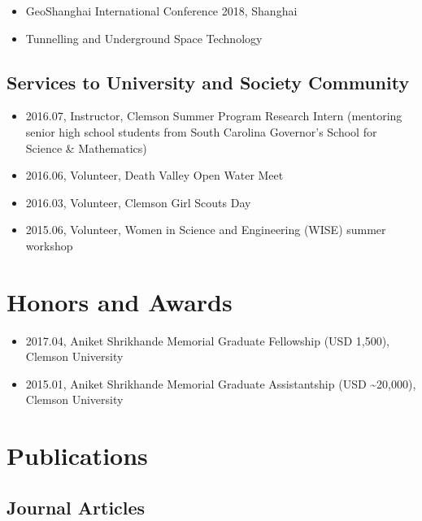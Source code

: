 \documentclass[11pt,]{elsarticle}
\providecommand{\tightlist}{%
  \setlength{\itemsep}{0pt}\setlength{\parskip}{0pt}}
\begin{document}
\begin{itemize}
\tightlist
\item
  GeoShanghai International Conference 2018, Shanghai
\item
  Tunnelling and Underground Space Technology
\end{itemize}

\hypertarget{services-to-university-and-society-community}{%
\subsection{Services to University and Society
Community}\label{services-to-university-and-society-community}}

\begin{itemize}
\tightlist
\item
  2016.07, Instructor, Clemson Summer Program Research Intern (mentoring
  senior high school students from South Carolina Governor's School for
  Science \& Mathematics)
\item
  2016.06, Volunteer, Death Valley Open Water Meet
\item
  2016.03, Volunteer, Clemson Girl Scouts Day
\item
  2015.06, Volunteer, Women in Science and Engineering (WISE) summer
  workshop
\end{itemize}

\hypertarget{honors-and-awards}{%
\section{Honors and Awards}\label{honors-and-awards}}

\begin{itemize}
\tightlist
\item
  2017.04, Aniket Shrikhande Memorial Graduate Fellowship (USD 1,500),
  Clemson University
\item
  2015.01, Aniket Shrikhande Memorial Graduate Assistantship (USD
  \textasciitilde20,000), Clemson University
\end{itemize}

\hypertarget{publications}{%
\section{Publications}\label{publications}}

\hypertarget{journal-articles}{%
\subsection{Journal Articles}\label{journal-articles}}
\end{document}

